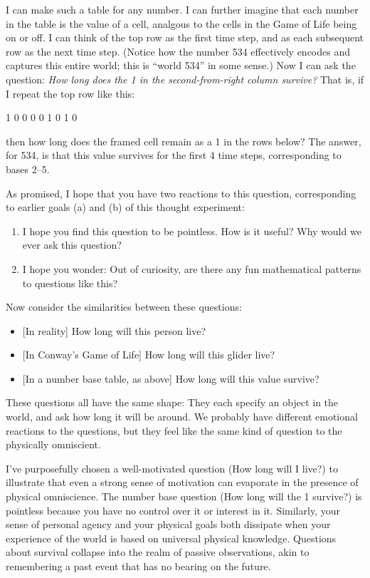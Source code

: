 \documentclass[11pt, oneside]{article}
\theoremstyle{argtstyle}
\begin{document}
I can make such a table for any number.
I can further imagine that each number in the table is the value of a cell,
analgous to the cells in the Game of Life being on or off.
I can think of the
top row as the first time step, and as each subsequent row as the next time
step.
(Notice how the number 534 effectively encodes and captures this entire
world; this is ``world 534'' in some sense.)
Now I can ask the question:
{\em How long does the 1 in the second-from-right column survive?}
That is, if I repeat the top row like this:
\begin{center}
    1 0 0 0 0 1 0 1  0
\end{center}
then how long does the framed cell
remain as a 1 in the rows below?
The answer, for 534, is that this value survives for the first 4
time steps, corresponding to bases 2--5.

As promised, I hope that you have two reactions to this question, corresponding
to earlier goals (a) and (b) of this thought experiment:
\begin{enumerate}
    \item I hope you find this question to be pointless. How is it useful?
        Why would we ever ask this question?
    \item I hope you wonder:
        Out of curiosity, are there any fun mathematical patterns to questions
        like this?
\end{enumerate}

Now consider the similarities between these questions:
\begin{itemize}
    \item{} [In reality] How long will this person live?
    \item{} [In Conway's Game of Life] How long will this glider live?
    \item{} [In a number base table, as above] How long will this value survive?
\end{itemize}
These questions all have the same shape: They each specify an
object in the world, and ask how long it will be around.
We probably have different emotional reactions to the questions, but they feel
like the same kind of question to the physically omniscient.

I've
purposefully chosen a well-motivated question (How long will I
live?) to illustrate that even a strong sense of motivation can evaporate
in the presence of physical omniscience.
The number base question (How long will the 1 survive?) is
pointless because you have no control over it or interest in it.
Similarly, your sense of personal agency
and your physical goals both dissipate when your experience of the world is
based
on universal physical knowledge. Questions about survival collapse into the
realm of passive observations, akin to remembering a past event that has no
bearing on the future.
\end{document}
